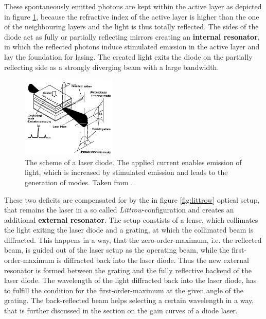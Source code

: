             These spontaneously emitted photons are kept within the active layer as depicted in figure \ref{fig:diode_laser_scheme}, because the refractive index of the active layer is higher than the one of the 
            neighbouring layers and the light is thus totally reflected. The sides of the diode act as fully or partially reflecting mirrors creating an \textbf{internal resonator}, in which the reflected photons
            induce stimulated emission in the active layer and lay the foundation for lasing. The created light exits the diode on the partially reflecting side as a strongly diverging beam with a large bandwidth.  

             \begin{figure}[h]
                \centering
                \includegraphics[width = 0.4\textwidth]{pictures/diode_laser_scheme.png}
                \caption{The scheme of a laser diode. The applied current enables emission of light, which is increased by stimulated emission and leads to the generation of modes. Taken from \cite{tu_dortmund_versuchsanleitung_2022-1}.}
                \label{fig:diode_laser_scheme}
             \end{figure}
         
             \FloatBarrier

            These two deficits are compensated for by the in figure \ref{fig:littrow} optical setup, that remains the laser in a so called \textit{Littrow}-configuration and creates an additional 
            \textbf{external resonator}. The setup constists of a lense, which collimates the light exiting the laser diode and a grating, at which the collimated beam is diffracted. This happens in a way, that
            the zero-order-maximum, i.e. the reflected beam, is guided out of the laser setup as the operating beam, while the first-order-maximum is diffracted back into the laser diode. Thus the new 
            external resonator is formed between the grating and the fully reflective backend of the laser diode. The wavelength of
            the light diffracted back into the laser diode, has to fulfill the condition for the first-order-maximum at the given angle of the grating. The back-reflected beam helps selecting a certain
            wavelength in a way, that is further discussed in the section on the gain curves of a diode laser.   


